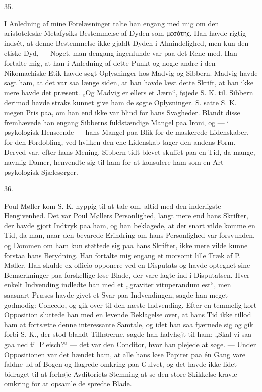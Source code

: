 \documentclass[12pt,a4paper,openany]{book}
\newcommand{\secnum}[1]{\par\begin{center}#1\end{center}\par\nobreak}
\newcommand{\opage}[1]{\marginnote{\footnotesize\textit{[#1]}}}
\begin{document}
\secnum{35.}

I Anledning af mine Forelæsninger talte han engang
med mig om den aristoteleske Metafysiks Bestemmelse
af Dyden som μεσότης. Han havde rigtig indsét, at denne
Bestemmelse ikke gjaldt Dyden i Almindelighed, men
\opage{362}kun den etiske Dyd, — Noget, man dengang ingenlunde
var paa det Rene med. Han fortalte mig, at han i Anledning
af dette Punkt og nogle andre i den Nikomachiske
Etik havde søgt Oplysninger hos Madvig og Sibbern.
Madvig havde sagt ham, at det var saa længe siden, at
han havde læst dette Skrift, at han ikke mere havde det
præsent. „Og Madvig er ellers et Jærn“, føjede S. K.
til. Sibbern derimod havde straks kunnet give ham de
søgte Oplysninger. S. satte S. K. megen Pris paa, om
han end ikke var blind for hans Svagheder. Blandt
disse fremhævede han engang Sibberns fuldstændige
Mangel paa Ironi, og — i psykologisk Henseende —
hans Mangel paa Blik for de maskerede Lidenskaber,
for den Fordobling, ved hvilken den ene Lidenskab
tager den andens Form. Derved var, efter hans Mening,
Sibbern tidt blevet skuffet paa en Tid, da mange, navnlig
Damer, henvendte sig til ham for at konsulere ham som
en Art psykologisk Sjælesørger.

\secnum{36.}

Poul Møller kom S. K. hyppig til at tale om, altid
med den inderligste Hengivenhed. Det var Poul Møllers
Personlighed, langt mere end hans Skrifter, der havde
gjort Indtryk paa ham, og han beklagede, at der snart
vilde komme en Tid, da man, naar den bevarede Erindring
om hans Personlighed var forsvunden, og Dommen
om ham kun støttede sig paa hans Skrifter, ikke mere
vilde kunne forstaa hans Betydning. Han fortalte mig
engang et morsomt lille Træk af P. Møller. Han skulde
ex officio opponere ved en Disputats og havde optegnet
sine Bemærkninger paa forskellige løse Blade, der vare
lagte ind i Disputatsen. Hver enkelt Indvending indledte
han med et „graviter vituperandum est“, men saasnart
Præses havde givet et Svar paa Indvendingen, sagde han
meget godmodig: Concedo, og gik over til den næste
Indvending. Efter en temmelig kort Opposition sluttede
\opage{363}han med en levende Beklagelse over, at hans Tid ikke
tillod ham at fortsætte denne interessante Samtale, og
idet han saa fjærnede sig og gik forbi S. K., der stod
blandt Tilhørerne, sagde han halvhøjt til ham: „Skal vi
saa gaa ned til Pleisch?“ — det var den Conditor, hvor
han plejede at søge. — Under Oppositionen var det hændet
ham, at alle hans løse Papirer paa én Gang vare faldne
ud af Bogen og flagrede omkring paa Gulvet, og det
havde ikke lidet bidraget til at forhøje Avditoriets Stemning
at se den store Skikkelse kravle omkring for at
opsamle de spredte Blade.
\end{document}
